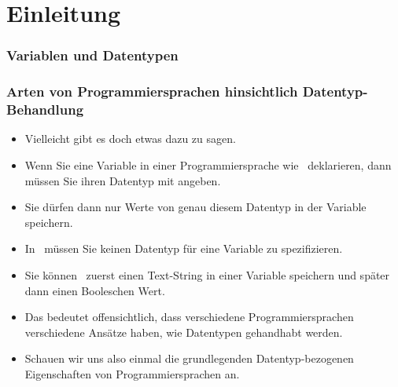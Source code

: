 \documentclass[aspectratio=169,mathserif,notheorems]{beamer}%
\subtitle{15.~Variablen:~Typen und Type Hints}%
\begin{document}
%
%
\startPresentation%
%
\section{Einleitung}%
\begin{frame}%
\frametitle{Variablen und Datentypen}%
%
%
%
%
%
%
\end{frame}%
%
\begin{frame}%
\frametitle{Arten von Programmiersprachen hinsichtlich Datentyp-Behandlung}%
\begin{itemize}%
\item Vielleicht gibt es doch etwas dazu zu sagen.%
\item<2-> Wenn Sie eine Variable in einer Programmiersprache wie~ deklarieren, dann müssen Sie ihren Datentyp mit angeben.%
\item<3-> Sie dürfen dann nur Werte von genau diesem Datentyp in der Variable speichern.%
\item<4-> In \python\ müssen Sie keinen Datentyp für eine Variable zu spezifizieren.%
\item<5-> Sie können \DEzB\ zuerst einen Text-String in einer Variable speichern und später dann einen Booleschen Wert.%
\item<6-> Das bedeutet offensichtlich, dass verschiedene Programmiersprachen verschiedene Ansätze haben, wie Datentypen gehandhabt werden.%
\item<7-> Schauen wir uns also einmal die grundlegenden Datentyp-bezogenen Eigenschaften von Programmiersprachen an.%
\end{itemize}%
\end{frame}%
\end{document}
